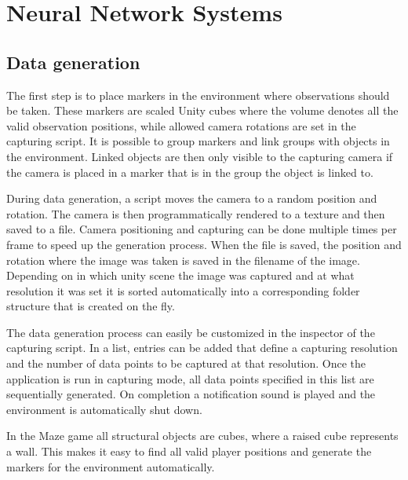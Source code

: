 
\chapter{Neural Network Systems}\label{NeuralNetworkSystems}
\section{Data generation}\label{DataGeneration}
The first step is to place markers in the environment where observations should be taken. These markers are scaled Unity cubes where the volume denotes all the valid observation positions, while allowed camera rotations are set in the capturing script. It is possible to group markers and link groups with objects in the environment. Linked objects are then only visible to the capturing camera if the camera is placed in a marker that is in the group the object is linked to.

During data generation, a script moves the camera to a random position and rotation. The camera is then programmatically rendered to a texture and then saved to a file. Camera positioning and capturing can be done multiple times per frame to speed up the generation process. When the file is saved, the position and rotation where the image was taken is saved in the filename of the image. Depending on in which unity scene the image was captured and at what resolution it was set it is sorted automatically into a corresponding folder structure that is created on the fly.

The data generation process can easily be customized in the inspector of the capturing script. In a list, entries can be added that define a capturing resolution and the number of data points to be captured at that resolution. Once the application is run in capturing mode, all data points specified in this list are sequentially generated. On completion a notification sound is played and the environment is automatically shut down.

In the Maze game all structural objects are cubes, where a raised cube represents a wall. This makes it easy to find all valid player positions and generate the markers for the environment automatically.


